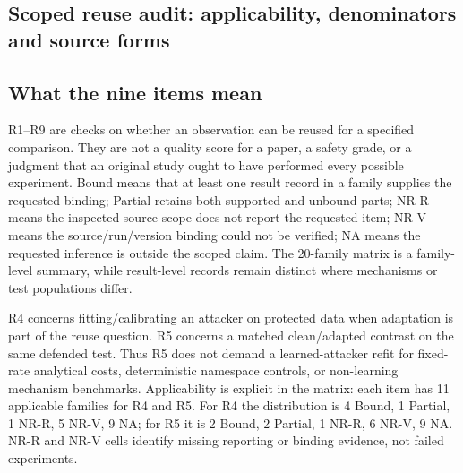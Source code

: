 \subsection{Scoped reuse audit: applicability, denominators and source forms}\label{sec:r8-sok-audit}

\subsection{What the nine items mean}
R1--R9 are checks on whether an observation can be reused for a specified comparison. They are not a quality score for a paper, a safety grade, or a judgment that an original study ought to have performed every possible experiment. Bound means that at least one result record in a family supplies the requested binding; Partial retains both supported and unbound parts; NR-R means the inspected source scope does not report the requested item; NR-V means the source/run/version binding could not be verified; NA means the requested inference is outside the scoped claim. The 20-family matrix is a family-level summary, while result-level records remain distinct where mechanisms or test populations differ.

R4 concerns fitting/calibrating an attacker on protected data when adaptation is part of the reuse question. R5 concerns a matched clean/adapted contrast on the same defended test. Thus R5 does not demand a learned-attacker refit for fixed-rate analytical costs, deterministic namespace controls, or non-learning mechanism benchmarks. Applicability is explicit in the matrix: each item has 11 applicable families for R4 and R5. For R4 the distribution is 4 Bound, 1 Partial, 1 NR-R, 5 NR-V, 9 NA; for R5 it is 2 Bound, 2 Partial, 1 NR-R, 6 NR-V, 9 NA. NR-R and NR-V cells identify missing reporting or binding evidence, not failed experiments.


